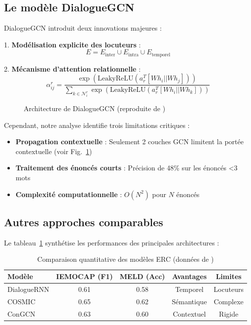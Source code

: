\documentclass[a4paper,11pt]{article}
\begin{document}
\subsection{Le modèle DialogueGCN}
DialogueGCN \cite{ghosal2019dialoguegcn} introduit deux innovations majeures :

1. \textbf{Modélisation explicite des locuteurs} :
\[
E = E_{\text{inter}} \cup E_{\text{intra}} \cup E_{\text{temporel}}
\]

2. \textbf{Mécanisme d'attention relationnelle} :
\[
\alpha_{ij}^r = \frac{\exp(\text{LeakyReLU}(a_r^T[Wh_i||Wh_j]))}{\sum_{k\in\mathcal{N}_i^r}\exp(\text{LeakyReLU}(a_r^T[Wh_i||Wh_k]))}
\]

\begin{figure}[htbp]
    \centering
    \caption{Architecture de DialogueGCN (reproduite de \cite{ghosal2019dialoguegcn})}
    \label{fig:dialoguegcn}
\end{figure}

Cependant, notre analyse identifie trois limitations critiques :

\begin{itemize}
    \item \textbf{Propagation contextuelle} : Seulement 2 couches GCN limitent la portée contextuelle (voir Fig.~\ref{fig:dialoguegcn})
    \item \textbf{Traitement des énoncés courts} : Précision de 48\% sur les énoncés <3 mots \cite{li2021survey}
    \item \textbf{Complexité computationnelle} : $O(N^2)$ pour $N$ énoncés
\end{itemize}

\subsection{Autres approches comparables}
Le tableau~\ref{tab:model_comparison} synthétise les performances des principales architectures :

\begin{table}[ht]
    \centering
    \begin{tabular}{lcccc}
        \toprule
        Modèle & IEMOCAP (F1) & MELD (Acc) & Avantages & Limites \\
        \midrule
        DialogueRNN & 0.61 & 0.58 & Temporel & Locuteurs \\
        COSMIC & 0.65 & 0.62 & Sémantique & Complexe \\
        ConGCN & 0.63 & 0.60 & Contextuel & Rigide \\
        \bottomrule
    \end{tabular}
    \caption{Comparaison quantitative des modèles ERC (données de \cite{zhang2023survey})}
    \label{tab:model_comparison}
\end{table}
\end{document}
